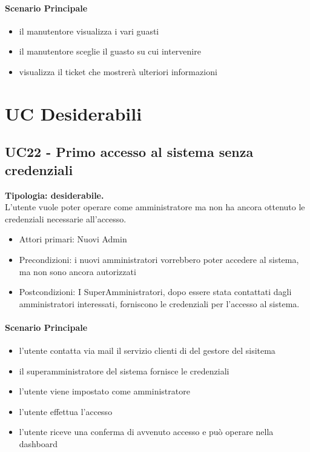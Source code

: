 \documentclass[12pt]{article}
\begin{document}
\paragraph{Scenario Principale}
\begin{itemize}
	\item il manutentore visualizza i vari guasti
	\item il manutentore sceglie il guasto su cui intervenire
	\item visualizza il ticket che mostrerà ulteriori informazioni
\end{itemize}


\section{UC Desiderabili}

\subsection{UC22 - Primo accesso al sistema senza credenziali}
\textbf{Tipologia: desiderabile.} \\
L'utente vuole poter operare come amministratore ma non ha ancora ottenuto le credenziali necessarie all'accesso.
\begin{itemize}
	\item Attori primari: Nuovi Admin
	\item Precondizioni: i nuovi amministratori vorrebbero poter accedere al sistema, ma non sono ancora autorizzati
	\item Postcondizioni: I SuperAmministratori, dopo essere stata contattati dagli amministratori interessati, forniscono le credenziali per l'accesso al sistema.
\end{itemize}
\paragraph{Scenario Principale}
\begin{itemize}
	\item l'utente contatta via mail il servizio clienti di del gestore del sisitema
	\item il superamministratore del sistema fornisce le credenziali
	\item l'utente viene impostato come amministratore
	\item l'utente effettua l'accesso
	\item l'utente riceve una conferma di avvenuto accesso e può operare nella dashboard
\end{itemize}
\end{document}
